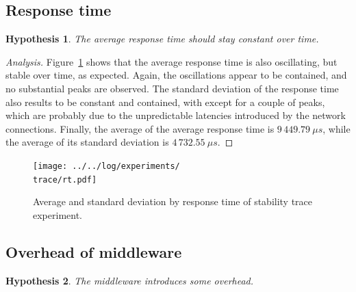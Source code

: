 \documentclass[11pt]{article}
\newtheorem{hyp}{Hypothesis}
\theoremstyle{definition}
\newenvironment{ana}[1][\proofname]{\begin{proof}[Analysis]}{\end{proof}}
\newcommand\trace{02_stability_trace_16-10-20_20:38:14}
\begin{document}
\subsection{Response time}\label{ssec:rt}

\begin{hyp}
    The average response time should stay constant over time.
\end{hyp}

\begin{ana}
    Figure~\ref{fig:trace_rt} shows that the average response time is also oscillating, but stable over time, as expected.
    Again, the oscillations appear to be contained, and no substantial peaks are observed.
    The standard deviation of the response time also results to be constant and contained, with except for a couple of peaks, which are probably due to the unpredictable latencies introduced by the network connections.
    Finally, the average of the average response time is $9\,449.79\ \mu s$, while the average of its standard deviation is $4\,732.55\ \mu s$.
\end{ana}

\begin{figure}[!h]
    \centering
    \texttt{[image: ../../log/experiments/\\trace/rt.pdf]}
    \caption{Average and standard deviation by response time of stability trace experiment.}
    \label{fig:trace_rt}
\end{figure}

\subsection{Overhead of middleware}

\begin{hyp}
    The middleware introduces some overhead.
\end{hyp}
\end{document}
